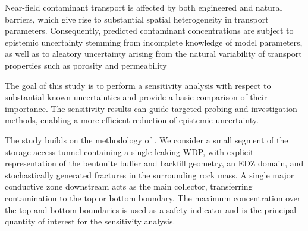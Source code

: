 






Near-field contaminant transport is affected by both engineered and natural barriers, which give rise to substantial spatial heterogeneity in transport parameters. Consequently, predicted contaminant concentrations are subject to epistemic uncertainty stemming from incomplete knowledge of model parameters, as well as to aleatory uncertainty arising from the natural variability of transport properties such as porosity and permeability


The goal of this study is to perform a sensitivity analysis with respect to substantial known uncertainties and provide a basic comparison of their importance.
The sensitivity results can guide targeted probing and investigation methods, enabling a more efficient reduction of epistemic uncertainty.

The study builds on the methodology of \cite{BrezinaMethodology2023}. We consider a small segment of the storage access tunnel containing a single leaking \gls{WDP}, with explicit representation of the bentonite buffer and backfill geometry, an EDZ domain, and stochastically generated fractures in the surrounding rock mass. A single major conductive zone downstream acts as the main collector, transferring contamination to the top or bottom boundary. The maximum concentration over the top and bottom boundaries is used as a safety indicator and is the principal quantity of interest for the sensitivity analysis.

